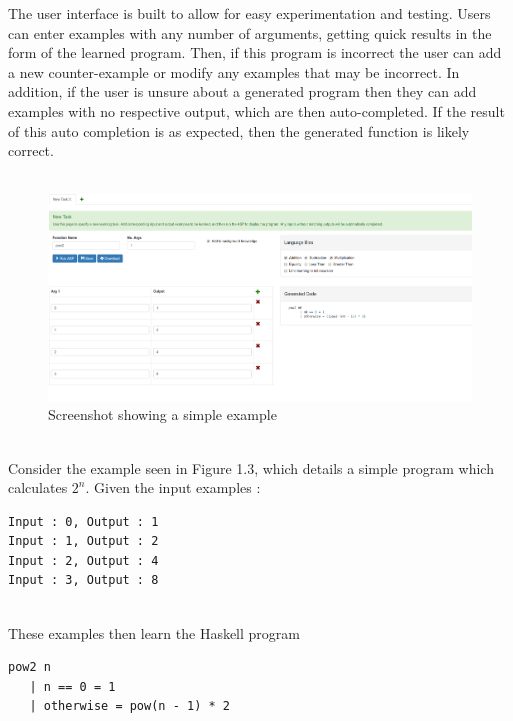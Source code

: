 The user interface is built to allow for easy experimentation and testing. Users can enter examples with any number of arguments, getting quick results in the form of the learned program. Then, if this program is incorrect the user can add a new counter-example or modify any examples that may be incorrect. In addition, if the user is unsure about a generated program then they can add examples with no respective output, which are then auto-completed. If the result of this auto completion is as expected, then the generated function is likely correct. \\ \\
\begin{figure}[h!]
\centering
\includegraphics[width=\textwidth]{C1/screenshot_pow2.png}
\caption{Screenshot showing a simple example}
\end{figure}
\mbox{}\\
Consider the example seen in Figure 1.3, which details a simple program which calculates $2^n$. Given the input examples :\\
\begin{lstlisting}
Input : 0, Output : 1
Input : 1, Output : 2
Input : 2, Output : 4
Input : 3, Output : 8
\end{lstlisting}
\mbox{}\\
These examples then learn the Haskell program \\
\begin{lstlisting}
pow2 n
   | n == 0 = 1
   | otherwise = pow(n - 1) * 2
\end{lstlisting}
\mbox{}\\

